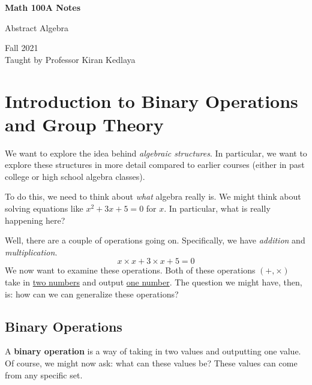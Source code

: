\documentclass[letterpaper]{article}
\begin{document}
\begin{titlepage}
    \begin{center}
        \vspace*{1cm}
            
        \Huge
        \textbf{Math 100A Notes}
            
        \vspace{0.5cm}
        \LARGE
        Abstract Algebra
            
        \vspace{1.5cm}
            
        \vfill
            
        Fall 2021\\
        Taught by Professor Kiran Kedlaya
    \end{center}
\end{titlepage}


\newpage 

\begingroup
    \renewcommand\contentsname{Table of Contents}
    \tableofcontents
\endgroup

\newpage
{}

\section{Introduction to Binary Operations and Group Theory}
We want to explore the idea behind \emph{algebraic structures}. In particular, we want to explore these structures in more detail compared to earlier courses (either in past college or high school algebra classes). 


\bigskip 

To do this, we need to think about \emph{what} algebra really is. We might think about solving equations like $x^2 + 3x + 5 = 0$ for $x$. In particular, what is really happening here?

\bigskip 

Well, there are a couple of operations going on. Specifically, we have \emph{addition} and \emph{multiplication}. 
\[x \times x + 3 \times x + 5 = 0\]
We now want to examine these operations. Both of these operations $(+, \times)$ take in \underline{two numbers} and output \underline{one number}. The question we might have, then, is: how can we can generalize these operations?


\subsection{Binary Operations}
A \textbf{binary operation} is a way of taking in two values and outputting one value. Of course, we might now ask: what can these values be? These values can come from any specific set. 
\end{document}
